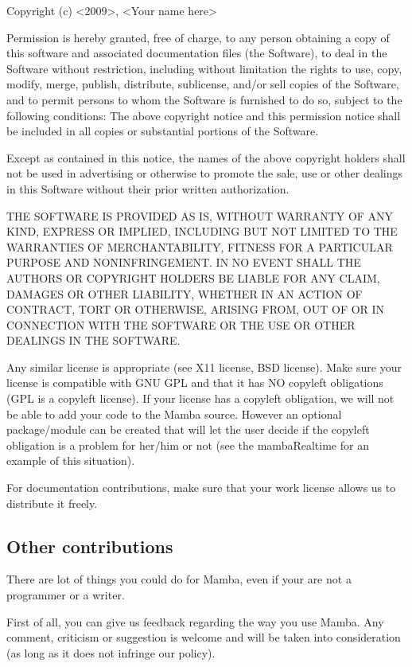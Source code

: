 \documentclass[a4paper,10pt,oneside]{article}
\begin{document}
%
\begin{minipage}[c]{0.8\textwidth}%
 {\small Copyright (c) <2009>, <Your name here>}{\small \vspace{0.5cm} \par}

{\small Permission is hereby granted, free of charge, to any person
obtaining a copy of this software and associated documentation files
(the \textquotedbl{}Software\textquotedbl{}), to deal in the Software
without restriction, including without limitation the rights to use,
copy, modify, merge, publish, distribute, sublicense, and/or sell
copies of the Software, and to permit persons to whom the Software
is furnished to do so, subject to the following conditions: The above
copyright notice and this permission notice shall be included in all
copies or substantial portions of the Software.}{\small \vspace{0.5cm} \par}

{\small Except as contained in this notice, the names of the above copyright 
holders shall not be used in advertising or otherwise to promote the sale, use 
or other dealings in this Software without their prior written authorization.}
{\small \vspace{0.5cm} \par}

{\small THE SOFTWARE IS PROVIDED \textquotedbl{}AS IS\textquotedbl{},
WITHOUT WARRANTY OF ANY KIND, EXPRESS OR IMPLIED, INCLUDING BUT NOT
LIMITED TO THE WARRANTIES OF MERCHANTABILITY, FITNESS FOR A PARTICULAR
PURPOSE AND NONINFRINGEMENT. IN NO EVENT SHALL THE AUTHORS OR COPYRIGHT
HOLDERS BE LIABLE FOR ANY CLAIM, DAMAGES OR OTHER LIABILITY, WHETHER
IN AN ACTION OF CONTRACT, TORT OR OTHERWISE, ARISING FROM, OUT OF
OR IN CONNECTION WITH THE SOFTWARE OR THE USE OR OTHER DEALINGS IN
THE SOFTWARE. }%
\vspace{1cm}
\end{minipage}

Any similar license is appropriate (see X11 license, BSD license). Make sure
your license is compatible with GNU GPL and that it has NO copyleft
obligations (GPL is a copyleft license). If your license has a copyleft
obligation, we will not be able to add your code to the Mamba source. However
an optional package/module can be created that will let the user decide if the
copyleft obligation is a problem for her/him or not (see the mambaRealtime for
an example of this situation).

For documentation contributions, make sure that your work license
allows us to distribute it freely.

\subsection{Other contributions}

There are lot of things you could do for Mamba, even if your are not
a programmer or a writer.

First of all, you can give us feedback regarding the way you use Mamba.
Any comment, criticism or suggestion is welcome and will be taken
into consideration (as long as it does not infringe our policy).
\end{document}
